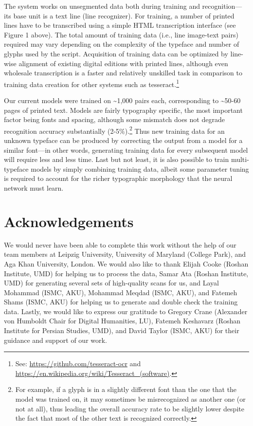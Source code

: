 The system works on unsegmented data both during training and recognition—its
base unit is a text line (line recognizer). For training, a number of printed
lines have to be transcribed using a simple HTML transcription interface (see
Figure 1 above). The total amount of training data (i.e., line image-text
pairs) required may vary depending on the complexity of the typeface and number
of glyphs used by the script. Acquisition of training data can be optimized by
line-wise alignment of existing digital editions with printed lines, although
even wholesale transcription is a faster and relatively unskilled task in
comparison to training data creation for other systems such as
tesseract.\footnote{See: \url{https://github.com/tesseract-ocr} and
\url{https://en.wikipedia.org/wiki/Tesseract_(software)}.}

Our current models were trained on \textasciitilde1,000 pairs each, corresponding to
\textasciitilde50-60 pages of printed text. Models are fairly typography specific,
the most important factor being fonts and spacing, although some mismatch does
not degrade recognition accuracy substantially (2-5\%).\footnote{For example,
if a glyph is in a slightly different font than the one that the model was
trained on, it may sometimes be misrecognized as another one (or not at all),
thus leading the overall accuracy rate to be slightly lower despite the fact
that most of the other text is recognized correctly.} Thus new training data
for an unknown typeface can be produced by correcting the output from a model
for a similar font—in other words, generating training data for every
subsequent model will require less and less time. Last but not least, it is
also possible to train multi-typeface models by simply combining training data,
albeit some parameter tuning is required to account for the richer typographic
morphology that the neural network must learn.

\section{Acknowledgements}

We would never have been able to complete this work without the help of our
team members at Leipzig University, University of Maryland (College Park), and
Aga Khan University, London. We would also like to thank Elijah Cooke (Roshan
Institute, UMD) for helping us to process the data, Samar Ata (Roshan
Institute, UMD) for generating several sets of high-quality scans for us, and
Layal Mohammad (ISMC, AKU), Mohammad Meqdad (ISMC, AKU), and Fatemeh Shams
(ISMC, AKU) for helping us to generate and double check the training data.
Lastly, we would like to express our gratitude to Gregory Crane (Alexander von
Humboldt Chair for Digital Humanities, LU), Fatemeh Keshavarz (Roshan Institute
for Persian Studies, UMD), and David Taylor (ISMC, AKU) for their guidance and
support of our work. 

